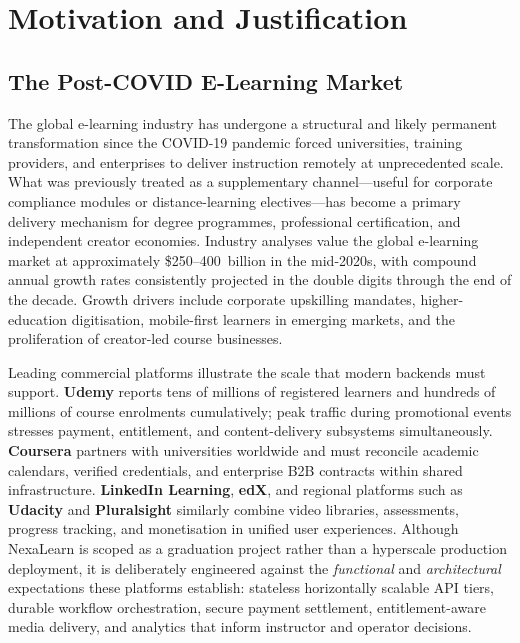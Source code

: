 
\section{Motivation and Justification}
\label{sec:motivation}

\subsection{The Post-COVID E-Learning Market}
\label{subsec:post-covid-market}

The global e-learning industry has undergone a structural and likely permanent transformation since the COVID-19 pandemic forced universities, training providers, and enterprises to deliver instruction remotely at unprecedented scale. What was previously treated as a supplementary channel---useful for corporate compliance modules or distance-learning electives---has become a primary delivery mechanism for degree programmes, professional certification, and independent creator economies. Industry analyses value the global e-learning market at approximately \$250--400~billion in the mid-2020s, with compound annual growth rates consistently projected in the double digits through the end of the decade. Growth drivers include corporate upskilling mandates, higher-education digitisation, mobile-first learners in emerging markets, and the proliferation of creator-led course businesses.

Leading commercial platforms illustrate the scale that modern backends must support. \textbf{Udemy} reports tens of millions of registered learners and hundreds of millions of course enrolments cumulatively; peak traffic during promotional events stresses payment, entitlement, and content-delivery subsystems simultaneously. \textbf{Coursera} partners with universities worldwide and must reconcile academic calendars, verified credentials, and enterprise B2B contracts within shared infrastructure. \textbf{LinkedIn Learning}, \textbf{edX}, and regional platforms such as \textbf{Udacity} and \textbf{Pluralsight} similarly combine video libraries, assessments, progress tracking, and monetisation in unified user experiences. Although NexaLearn is scoped as a graduation project rather than a hyperscale production deployment, it is deliberately engineered against the \textit{functional} and \textit{architectural} expectations these platforms establish: stateless horizontally scalable API tiers, durable workflow orchestration, secure payment settlement, entitlement-aware media delivery, and analytics that inform instructor and operator decisions.

